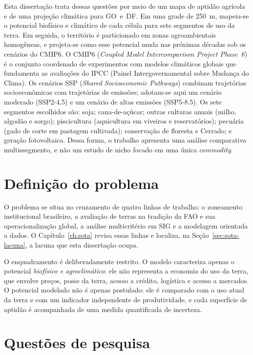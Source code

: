 Esta dissertação trata dessas questões por meio de um mapa de aptidão agrícola
e de uma projeção climática para GO~e~DF. Em uma grade de 250~m, mapeia-se o potencial biofísico e
climático de cada célula para sete segmentos de uso da terra. Em seguida, o território é particionado
em zonas agroambientais homogêneas, e projeta-se como esse potencial muda nas próximas décadas sob os
cenários do CMIP6. O CMIP6 (\textit{Coupled Model Intercomparison Project Phase~6}) é o conjunto coordenado
de experimentos com modelos climáticos globais que fundamenta as avaliações do IPCC (Painel
Intergovernamental sobre Mudança do Clima). Os cenários SSP (\textit{Shared Socioeconomic Pathways})
combinam trajetórias socioeconômicas com trajetórias de emissões; adotam-se aqui um cenário moderado
(SSP2-4.5) e um cenário de altas emissões (SSP5-8.5). Os sete segmentos escolhidos são: soja;
cana-de-açúcar; outras culturas anuais (milho, algodão e sorgo); piscicultura (aquicultura em viveiros e
reservatórios); pecuária (gado de corte em pastagem cultivada); conservação de floresta e Cerrado; e
geração fotovoltaica. Dessa forma, o trabalho apresenta uma análise comparativa multissegmento, e não
um estudo de nicho focado em uma única \emph{commodity}.

\section{Definição do problema}

O problema se situa no cruzamento de quatro linhas de trabalho: o zoneamento institucional
brasileiro, a avaliação de terras na tradição da FAO e sua operacionalização global, a análise
multicritério em SIG e a modelagem orientada a dados. O Capítulo~\ref{ch:sota} revisa essas linhas
e localiza, na Seção~\ref{sec:sota-lacuna}, a lacuna que esta dissertação ocupa.

O enquadramento é deliberadamente restrito. O modelo caracteriza apenas o potencial \emph{biofísico e
agroclimático}: ele não representa a economia do uso da terra, que envolve preços, posse
da terra, acesso a crédito, logística e acesso a mercados. O potencial modelado não é apenas
postulado: ele é comparado com o uso atual da terra e com um indicador independente de produtividade,
e cada superfície de aptidão é acompanhada de uma medida quantificada de incerteza.

\section{Questões de pesquisa}

